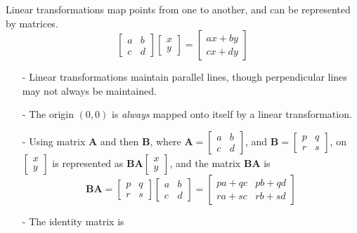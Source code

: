 \documentclass[11pt, a4paper]{article}
\begin{document}
Linear transformations map points from one to another, and can be represented by matrices.
\begin{equation*}
\begin{bmatrix} a & b \\ c& d\end{bmatrix}\begin{bmatrix} x \\ y \end{bmatrix}=\begin{bmatrix} ax+by \\ cx+dy\end{bmatrix}
\end{equation*}
\begin{itemize}
\item[-]Linear transformations maintain parallel lines, though perpendicular lines may not always be maintained.
\item[-]The origin $(0,0)$ is \emph{always} mapped onto itself by a linear transformation.
	\item[-]Using matrix $\boldsymbol{A}$ and then $\boldsymbol{B}$, where $\boldsymbol{A}=\begin{bmatrix} a & b \\ c& d\end{bmatrix}$, and $\boldsymbol{B}=\begin{bmatrix} p & q \\ r & s \end{bmatrix}$, on $\begin{bmatrix} x \\ y \end{bmatrix}$ is represented as $\boldsymbol{BA}\begin{bmatrix} x\\ y\end{bmatrix}$, and the matrix $\boldsymbol{BA}$ is
\begin{equation*}
\boldsymbol{BA}=\begin{bmatrix} p & q \\ r& s\end{bmatrix}\begin{bmatrix} a & b \\ c& d\end{bmatrix}=\begin{bmatrix} pa+qc & pb+qd \\ ra+sc& rb+sd\end{bmatrix}
\end{equation*}
\item[-]The identity matrix is 

\end{itemize}
\end{document}
